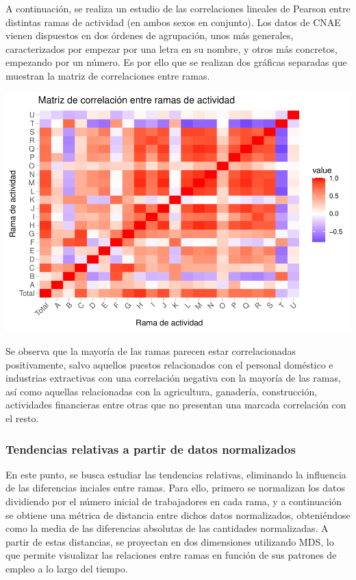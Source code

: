\documentclass[notspecified,article,submit,moreauthors,pdftex]{Definitions/mdpi}
\begin{document}
A continuación, se realiza un estudio de las correlaciones lineales de
Pearson entre distintas ramas de actividad (en ambos sexos en conjunto).
Los datos de CNAE vienen dispuestos en dos órdenes de agrupación, unos
más generales, caracterizados por empezar por una letra en su nombre, y
otros más concretos, empezando por un número. Es por ello que se
realizan dos gráficas separadas que muestran la matriz de correlaciones
entre ramas.

\includegraphics{ProyectoAED2024_files/figure-latex/unnamed-chunk-41-1.pdf}

Se observa que la mayoría de las ramas parecen estar correlacionadas
positivamente, salvo aquellos puestos relacionados con el personal
doméstico e industrias extractivas con una correlación negativa con la
mayoría de las ramas, así como aquellas relacionadas con la agricultura,
ganadería, construcción, actividades financieras entre otras que no
presentan una marcada correlación con el resto.

\subsubsection{Tendencias relativas a partir de datos
normalizados}\label{tendencias-relativas-a-partir-de-datos-normalizados}

En este punto, se busca estudiar las tendencias relativas, eliminando la
influencia de las diferencias inciales entre ramas. Para ello, primero
se normalizan los datos dividiendo por el número inicial de trabajadores
en cada rama, y a continuación se obtiene una métrica de distancia entre
dichos datos normalizados, obteniéndose como la media de las diferencias
absolutas de las cantidades normalizadas. A partir de estas distancias,
se proyectan en dos dimensiones utilizando MDS, lo que permite
visualizar las relaciones entre ramas en función de sus patrones de
empleo a lo largo del tiempo.
\end{document}
